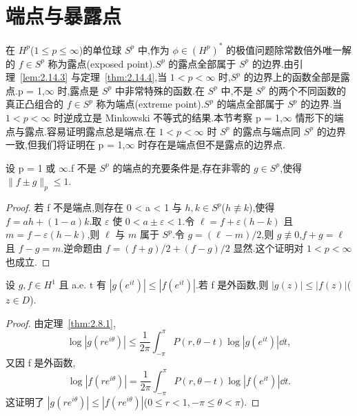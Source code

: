 \section{端点与暴露点}\label{sec:2.15}


在 $H^{p}$($1 \leq p \leq \infty$)的单位球 $S^{p}$ 中,作为 $\phi \in (H^{p})^{*}$ 的极值问题除常数倍外唯一解的 $f \in S^{p}$ 称为露点(exposed point).$S^{p}$ 的露点全部属于 $S^{p}$ 的边界.由引理~\ref{lem:2.14.3} 与定理~\ref{thm:2.14.4},当 $1 < p < \infty$ 时,$S^{p}$ 的边界上的函数全部是露点.p = 1,$\infty$ 时,露点是 $S^{p}$ 中非常特殊的函数.在 $S^{p}$ 中,不是 $S^{p}$ 的两个不同函数的真正凸组合的 $f \in S^{p}$ 称为端点(extreme point).$S^{p}$ 的端点全部属于 $S^{p}$ 的边界.当 $1 < p < \infty$ 时逆成立是 Minkowski 不等式的结果.本节考察 p = 1,$\infty$ 情形下的端点与露点.容易证明露点总是端点.在 $1 < p < \infty$ 时 $S^{p}$ 的露点与端点同 $S^{p}$ 的边界一致,但我们将证明在 p = 1,$\infty$ 时存在是端点但不是露点的边界点.

\begin{lemma}\label{lem:2.15.1}
设 p = 1 或 $\infty$.f 不是 $S^{p}$ 的端点的充要条件是,存在非零的 $g \in S^{p}$,使得 $\|f \pm g\|_{p} \leq 1$.
\end{lemma}

\begin{proof}
若 f 不是端点,则存在 0 < a < 1 与 $h, k \in S^{p}$($h \not\equiv k$),使得 $f = ah + (1-a)k$.取 $\varepsilon$ 使 $0 < a \pm \varepsilon < 1$.令 $\ell = f + \varepsilon(h - k)$ 且 $m = f - \varepsilon(h - k)$,则 $\ell$ 与 $m$ 属于 $S^{p}$.令 $g = (\ell - m)/2$,则 $g \not\equiv 0$,$f + g = \ell$ 且 $f - g = m$.逆命题由 $f = (f + g)/2 + (f - g)/2$ 显然.这个证明对 $1 < p < \infty$ 也成立.
\end{proof}

\begin{lemma}\label{lem:2.15.2}
设 $g, f \in H^{1}$ 且 a.e. t 有 $|g(e^{it})| \leq |f(e^{it})|$.若 f 是外函数,则 $|g(z)| \leq |f(z)|$($z \in D$).
\end{lemma}

\begin{proof}
由定理~\ref{thm:2.8.1},
\begin{equation*}
\log|g(re^{i\theta})| \leq \frac{1}{2\pi}\int_{-\pi}^{\pi} P(r, \theta - t)\log|g(e^{it})|\dd t,
\end{equation*}
又因 f 是外函数,
\begin{equation*}
\log|f(re^{i\theta})| = \frac{1}{2\pi}\int_{-\pi}^{\pi} P(r, \theta - t)\log|f(e^{it})|\dd t.
\end{equation*}
这证明了 $|g(re^{i\theta})| \leq |f(re^{i\theta})|$($0 \leq r < 1, -\pi \leq \theta < \pi$).
\end{proof}

